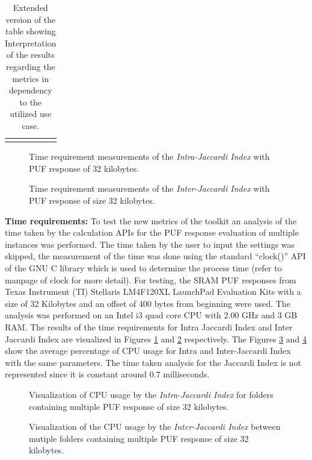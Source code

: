 \begin{table}[!ht]
\begin{tabular}{@{}lccccc@{}}
\addlinespace
\bottomrule
\end{tabular}
\caption{Extended version of the table showing Interpretation of the results regarding the metrics in dependency to the utilized use case.}
\label{tab:metrics}
\end{table}

\begin{figure}
\centering
{}
\caption{Time requirement measurements of the \emph{Intra-Jaccardi Index} with PUF response of 32 kilobytes.}
\label{img:time_intra}
\end{figure}

\begin{figure}
\centering
{}
\caption{Time requirement measurements of the \emph{Inter-Jaccardi Index} with PUF response of size 32 kilobytes.}
\label{img:time_inter}
\end{figure}

\textbf{Time requirements:} To test the new metrics of the toolkit an analysis of the time taken by the calculation APIs for the PUF response evaluation of multiple instances was performed. The time taken by the user to input the settings was skipped, the measurement of the time was done using the standard ``clock()'' API of the GNU C library which is used to determine the process time (refer to manpage of clock for more detail). For testing, the SRAM PUF responses from Texas Instrument (TI) Stellaris LM4F120XL LaunchPad Evaluation Kits with a
size of 32 Kilobytes and an offset of 400 bytes from beginning were used. The analysis was performed on an Intel i3 quad core CPU with 2.00 GHz and 3 GB RAM. The results of the time requirements for Intra Jaccardi Index and Inter Jaccardi Index are visualized in Figures \ref{img:time_intra} and \ref{img:time_inter} respectively. The Figures \ref{img:cpu_intra} and \ref{img:cpu_inter} show the average percentage of CPU usage for Intra and Inter-Jaccardi Index with the same parameters. The time taken analysis for the Jaccardi Index is not represented since it is constant around $0.7$ milliseconds.

\begin{figure}
\centering
{}
\caption{Visualization of CPU usage by the \emph{Intra-Jaccardi Index} for folders containing multiple PUF response of size 32 kilobytes.}
\label{img:cpu_intra}
\end{figure}

\begin{figure}
\centering
{}
\caption{Visualization of the CPU usage by the \emph{Inter-Jaccardi Index} between mutiple folders containing multiple PUF response of size 32 kilobytes.}
\label{img:cpu_inter}
\end{figure}
